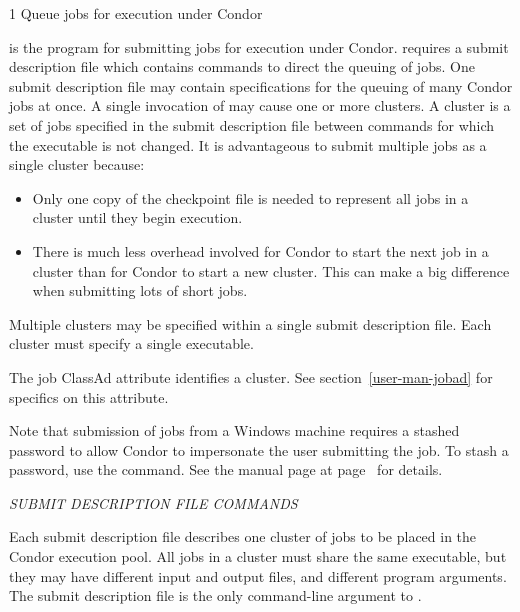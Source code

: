 \begin{ManPage}{\label{man-condor-submit}}{1}
{Queue jobs for execution under Condor}
\Synopsis {}
\ToolDebugOption
\Lbr{}  \Opt{\Dots}\Rbr 
{}


\Description

 is the program for submitting jobs for execution
under Condor.
 requires a submit description file which contains commands
to direct the queuing of jobs.
One submit description file may contain
specifications for the queuing of many Condor jobs at once.
A single invocation of  may cause one or
more clusters.
A cluster is a set of jobs
specified in the submit description file
between  commands for which the executable is not changed.
It is advantageous to submit
multiple jobs as a single cluster because:
\begin{itemize}
\item Only one copy of the checkpoint file is needed to 
represent all jobs in a cluster until they begin execution.
\item There is much less overhead involved for Condor to start the next
job in a cluster than for Condor to start a new cluster.  This can make
a big difference when submitting lots of short jobs.
\end{itemize}

Multiple clusters may be specified within a single
submit description file.
Each cluster must specify a single executable.

The job ClassAd attribute  identifies a cluster.
See section~\ref{user-man-jobad} for specifics on this attribute.

Note that submission of jobs from a Windows machine requires
a stashed password to allow Condor to impersonate the user submitting
the job.
To stash a password, use the  command.
See the manual page at
page~\pageref{man-condor-store-cred} for details.

\emph{SUBMIT DESCRIPTION FILE COMMANDS}

Each submit description file describes one cluster of jobs to be
placed in the Condor execution pool. All jobs in a cluster must share
the same executable, but they may have different input and output files,
and different program arguments. The submit description file is
the only command-line argument to . 


\end{ManPage}
